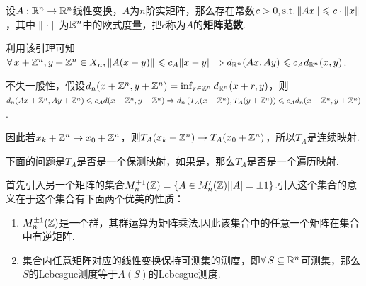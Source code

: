 \begin{lemma}[矩阵范数的存在性]
    设$A:\mathbb{R}^n\to\mathbb{R}^n$线性变换，$A$为$n$阶实矩阵，那么存在常数$c>0,\operatorname{\text{s.t.}} \|Ax\|\leqslant c\cdot\|x\|$，其中$\|\cdot\|$为$\mathbb{R}^n$中的欧式度量，把$c$称为$A$的\textbf{矩阵范数}.
\end{lemma}
利用该引理可知$\forall\, x+\mathbb{Z}^n,y+\mathbb{Z}^n\in X_n,\|A(x-y)\|\leqslant c_A\|x-y\|\Rightarrow d_{\mathbb{R}^n}(Ax,Ay)\leqslant c_Ad_{\mathbb{R}^n}(x,y)$.\par
不失一般性，假设$d_n(x+\mathbb{Z}^n,y+\mathbb{Z}^n)=\inf_{r\in\mathbb{Z}^n}{d_{\mathbb{R}^n}(x+r,y)}$，则$d_n(Ax+\mathbb{Z}^n,Ay+\mathbb{Z}^n)\leqslant c_A d(x+\mathbb{Z}^n,y+\mathbb{Z}^n)\Rightarrow d_n \left(T_A(x+\mathbb{Z}^n),T_A(y+\mathbb{Z}^n)\right)\leqslant c_A d_n(x+\mathbb{Z}^n,y+\mathbb{Z}^n)$.\par
因此若$x_k+\mathbb{Z}^n\to x_0+\mathbb{Z}^n$，则$T_A(x_k+\mathbb{Z}^n)\to T_A(x_0+\mathbb{Z}^n)$，所以$T_A$是连续映射.\par
下面的问题是$T_A$是否是一个保测映射，如果是，那么$T_A$是否是一个遍历映射.\par
首先引入另一个矩阵的集合$M^{\pm 1}_n(\mathbb{Z})=\left\{A\in M'_n(\mathbb{Z})||A|=\pm 1\right\}$.引入这个集合的意义在于这个集合有下面两个优美的性质：
\begin{enumerate}
    \item  $M^{\pm 1}_n(\mathbb{Z})$是一个群，其群运算为矩阵乘法.因此该集合中的任意一个矩阵在集合中有逆矩阵.
    \item  集合内任意矩阵对应的线性变换保持可测集的测度，即$\forall\, S\subseteq \mathbb{R}^n$可测集，那么$S$的Lebesgue测度等于$A(S)$的Lebesgue测度.
\end{enumerate}

